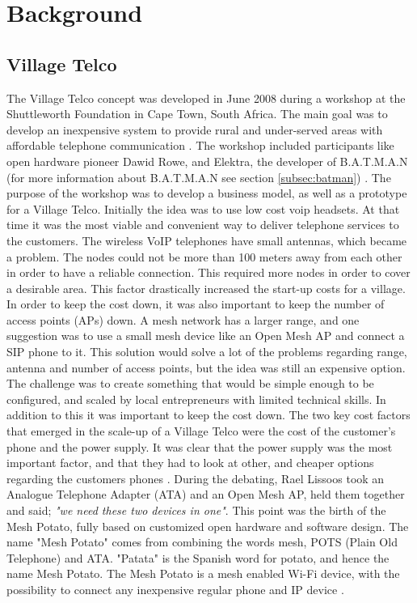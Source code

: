 \chapter{Background}
\label{chp:background} 

\section{Village Telco}
The Village Telco concept was developed in June 2008 during a workshop at the Shuttleworth Foundation in Cape Town, South Africa. The main goal was to develop an inexpensive system to provide rural and under-served areas with affordable telephone communication \cite{MParticle}. The workshop included participants like open hardware pioneer Dawid Rowe, and Elektra, the developer of B.A.T.M.A.N (for more information about B.A.T.M.A.N see section \ref{subsec:batman}) \cite{MPworkshop}. The purpose of the workshop was to develop a business model, as well as a prototype for a Village Telco. Initially the idea was to use low cost \gls{voip} headsets. At that time it was the most viable and convenient way to deliver telephone services to the customers. The wireless VoIP telephones have small antennas, which became a problem. The nodes could not be more than 100 meters away from each other in order to have a reliable connection. This required more nodes in order to cover a desirable area. This factor drastically increased the start-up costs for a village. In order to keep the cost down, it was also important to keep the number of access points (APs) down. A mesh network has a larger range, and one suggestion was to use a small mesh device like an Open Mesh AP and connect a SIP phone to it. This solution would solve a lot of the problems regarding range, antenna and number of access points, but the idea was still an expensive option. The challenge was to create something that would be simple enough to be configured, and scaled by local entrepreneurs with limited technical skills. In addition to this it was important to keep the cost down. The two key cost factors that emerged in the scale-up of a Village Telco were the cost of the customer's phone and the power supply. It was clear that the power supply was the most important factor, and that they had to look at other, and cheaper options regarding the customers phones \cite{MPworkshop}. During the debating, Rael Lissoos took an Analogue Telephone Adapter (ATA) and an Open Mesh AP, held them together and said; \textit{"we need these two devices in one"}. This point was the birth of the Mesh Potato, fully based on customized open hardware and software design. The name "Mesh Potato" comes from combining the words mesh, POTS (Plain Old Telephone) and ATA. "Patata" is the Spanish word for potato, and hence the name Mesh Potato. The Mesh Potato is a mesh enabled Wi-Fi device, with the possibility to connect any inexpensive regular phone and IP device \cite{MPorigin}.


